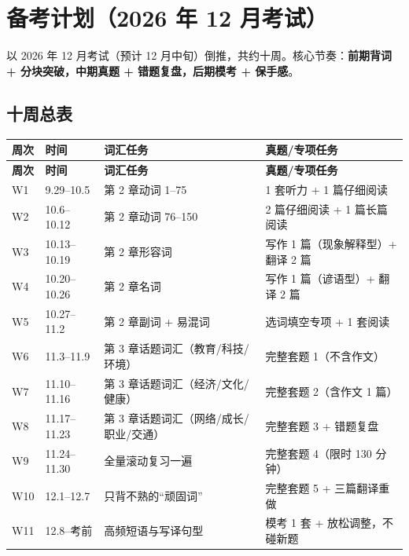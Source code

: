 \section{备考计划（2026 年 12 月考试）}

以 2026 年 12 月考试（预计 12 月中旬）倒推，共约十周。核心节奏：\textbf{前期背词 + 分块突破，中期真题 + 错题复盘，后期模考 + 保手感}。

\subsection{十周总表}

\begin{center}
\small
\begin{longtable}{p{1.6cm}p{3.1cm}p{5.3cm}p{4.6cm}}
\toprule
\textbf{周次} & \textbf{时间} & \textbf{词汇任务} & \textbf{真题/专项任务} \\
\midrule
\endfirsthead
\toprule
\textbf{周次} & \textbf{时间} & \textbf{词汇任务} & \textbf{真题/专项任务} \\
\midrule
\endhead
W1 & 9.29--10.5 & 第 2 章动词 1--75 & 1 套听力 + 1 篇仔细阅读 \\
\midrule
W2 & 10.6--10.12 & 第 2 章动词 76--150 & 2 篇仔细阅读 + 1 篇长篇阅读 \\
\midrule
W3 & 10.13--10.19 & 第 2 章形容词 & 写作 1 篇（现象解释型）+ 翻译 2 篇 \\
\midrule
W4 & 10.20--10.26 & 第 2 章名词 & 写作 1 篇（谚语型）+ 翻译 2 篇 \\
\midrule
W5 & 10.27--11.2 & 第 2 章副词 + 易混词 & 选词填空专项 + 1 套阅读 \\
\midrule
W6 & 11.3--11.9 & 第 3 章话题词汇（教育/科技/环境） & 完整套题 1（不含作文） \\
\midrule
W7 & 11.10--11.16 & 第 3 章话题词汇（经济/文化/健康） & 完整套题 2（含作文 1 篇） \\
\midrule
W8 & 11.17--11.23 & 第 3 章话题词汇（网络/成长/职业/交通） & 完整套题 3 + 错题复盘 \\
\midrule
W9 & 11.24--11.30 & 全量滚动复习一遍 & 完整套题 4（限时 130 分钟） \\
\midrule
W10 & 12.1--12.7 & 只背不熟的“顽固词” & 完整套题 5 + 三篇翻译重做 \\
\midrule
W11 & 12.8--考前 & 高频短语与写译句型 & 模考 1 套 + 放松调整，不碰新题 \\
\bottomrule
\end{longtable}
\end{center}

